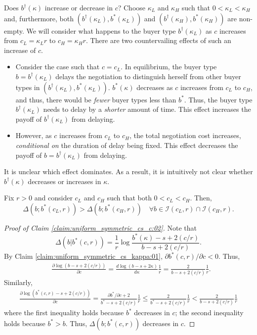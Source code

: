 \begin{appendices}
Does $b^\dagger(\kappa)$ increase or decrease in $c$? 
Choose $\kappa_L$ and $\kappa_H$ such that $0<\kappa_L<\kappa_H$ and, furthermore, both $(b^\dagger(\kappa_L), b^*(\kappa_L))$ and $(b^\dagger(\kappa_H), b^*(\kappa_H))$ are non-empty. 
We will consider what happens to the buyer type $b^\dagger(\kappa_L)$ as $c$ increases from $c_L=\kappa_L r $ to $c_H=\kappa_H r$. There are two countervailing effects of such an increase of $c$.
    \begin{itemize}
    \item Consider the case such that $c=c_L$. In equilibrium, the buyer type $b=b^\dagger(\kappa_L)$ delays the negotiation to distinguish herself from other buyer types in $(b^\dagger(\kappa_L),b^*(\kappa_L))$. $b^*(\kappa)$ decreases as $c$ increases from $c_L$ to $c_H$, and thus, there would be \emph{fewer} buyer types less than $b^*$. Thus, the buyer type $b^\dagger
(\kappa_L)$ needs to delay by a \emph{shorter} amount of time. This effect increases the payoff of $b^\dagger(\kappa_L)$ from delaying. 

    \item However, as $c$ increases from $c_L$ to $c_H$, the total negotiation cost increases, \emph{conditional on} the duration of delay being fixed. This effect decreases the payoff of $b=b^\dagger(\kappa_L)$ from delaying.
     
    \end{itemize}
It is unclear which effect dominates. As a result, it is intuitively not clear whether $b^\dagger(\kappa)$ decreases or increases in $\kappa$. 
\bigskip


\begin{claim}\label{claim:uniform_symmetric_cs_c:02} Fix $r>0$ and consider $c_L$ and $c_H$ such that both $0<c_L<c_H$. Then, 
    $$
    \Delta(b;b^*(c_L,r)) > \Delta(b;b^*(c_H,r)) \quad\forall b\in \mathcal{I}(c_L,r)\cap \mathcal{I}(c_H,r). 
    $$
\end{claim}

\begin{proof}[Proof of Claim \ref{claim:uniform_symmetric_cs_c:02}] 
Note that 
    $$
    \Delta(b|b^*(c,r)) = \frac{1}{r}\log\frac{b^*(\kappa)-s+2(c/r)}{b-s+2(c/r)}.
    $$
By Claim \ref{claim:uniform_symmetric_cs_kappa:01}, $\partial b^*(c,r)/\partial c<0$. Thus, 
    \begin{align*}
    &
    \frac{\partial \log (b-s+2(c/r))}{\partial c}=
    \frac{d\log (b-s+2\kappa)}{d \kappa}\frac{1}{r} = \frac{2}{b-s+2(c/r)} \frac{1}{r}.
    \end{align*}
Similarly, 
    \begin{align*}
    \frac{\partial\log (b^*(c,r)-s+2(c/r))}{\partial c} = \frac{\partial b^*/\partial c+2}{b^*-s+2(c/r)}\frac{1}{r}
    \leq  \frac{2}{b^*-s+2(c/r)}\frac{1}{r} < \frac{2}{b-s+2(c/r)}\frac{1}{r}
    \end{align*}
where the first inequality holds because $b^*$ decreases in $c$; the second inequality holds because $b^*>b$. Thus, $\Delta(b;b^*(c,r))$ decreases in $c$.
\end{proof}





\end{appendices}
